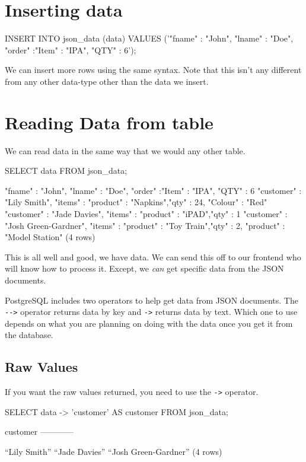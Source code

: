 \section*{Inserting data}
\begin{sql}
INSERT INTO json_data (data) VALUES ('{"fname" : "John", "lname" : "Doe", "order" :{"Item" : "IPA", "QTY" : 6}}');
\end{sql}

We can insert more rows using the same syntax. Note that this isn't any different from any other data-type other than the data we insert. 

\section*{Reading Data from table}
We can read data in the same way that we would any other table.
\begin{sql}
SELECT data FROM json_data;
\end{sql}
\begin{pseudo}
{"fname" : "John", "lname" : "Doe", "order" :{"Item" : "IPA", "QTY" : 6}}
{ "customer" : "Lily Smith", "items" : {"product" : "Napkins","qty" : 24, "Colour" : "Red"}}
{ "customer" : "Jade Davies", "items" : {"product" : "iPAD","qty" : 1}}
{ "customer" : "Josh Green-Gardner", "items" : {"product" : "Toy Train","qty" : 2, "product" : "Model Station"}}
(4 rows)
\end{pseudo}

This is all well and good, we have data. We can send this off to our frontend who will know how to process it. Except, we \textit{can} get specific data from the JSON documents. 

PostgreSQL includes two operators to help get data from JSON documents. The \verb|-->| operator returns data by key and \verb|->| returns data by text. Which one to use depends on what you are planning on doing with the data once you get it from the database. 

\subsection*{Raw Values}
If you want the raw values returned, you need to use the \verb|->| operator. 
\begin{sql}
SELECT data -> 'customer'  AS customer FROM json_data;
\end{sql}
\begin{pseudo*}
customer
------------

“Lily Smith”
“Jade Davies”
“Josh Green-Gardner”
(4 rows)
\end{pseudo*}

